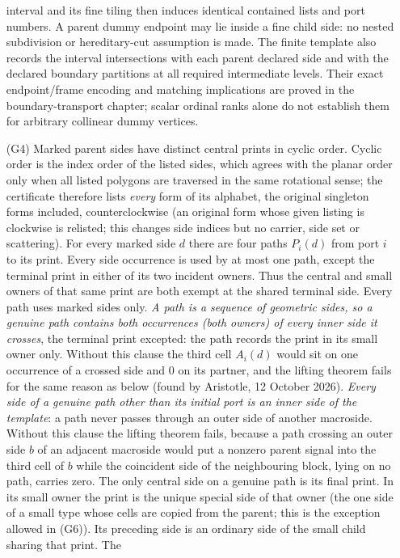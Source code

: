 \begin{definition}
\begin{enumerate}
interval and its fine tiling then induces identical contained lists and
port numbers.  A parent
dummy endpoint may lie inside a fine child side: no nested subdivision
or hereditary-cut assumption is made.  The finite template also records
the interval intersections with each parent declared side and with the
declared boundary partitions at all required intermediate levels.
Their exact endpoint/frame encoding and matching implications are proved
in the boundary-transport chapter; scalar ordinal ranks alone do not
establish them for arbitrary collinear dummy vertices.
\item[(G4)] Marked parent sides have distinct central prints in cyclic
order.  Cyclic order is the index order of the listed sides, which agrees
with the planar order only when all listed polygons are traversed in the
same rotational sense; the certificate therefore lists \emph{every} form
of its alphabet, the original singleton forms included, counterclockwise
(an original form whose given listing is clockwise is relisted; this
changes side indices but no carrier, side set or scattering).  For every marked side $d$ there are four paths $P_i(d)$ from port
$i$ to its print.  Every side occurrence is used by at most one path,
except the terminal print in either of its two incident owners.  Thus
the central and small owners of that same print are both exempt at the
shared terminal side.  Every path uses marked sides only.  \emph{A path is a sequence of geometric sides, so a genuine path contains both occurrences (both owners) of every inner side it crosses}, the terminal print excepted: the path records the print in its small owner only.  Without this clause the third cell $A_i(d)$ would sit on one occurrence of a crossed side and $0$ on its partner, and the lifting theorem fails for the same reason as below (found by Aristotle, 12 October 2026).  \emph{Every
side of a genuine path other than its initial port is an inner side of the
template}: a path never passes through an outer side of another macroside.
Without this clause the lifting theorem fails, because a path crossing an
outer side $b$ of an adjacent macroside would put a nonzero parent signal
into the third cell of $b$ while the coincident side of the neighbouring
block, lying on no path, carries zero.  The only central side on a genuine
path is its final print.  In its small owner the print is the unique
special side of that owner (the one side of a small type whose cells are
copied from the parent; this is the exception allowed in (G6)).  Its preceding
side is an ordinary side of the small child sharing that print.  The

\end{enumerate}
\end{definition}
